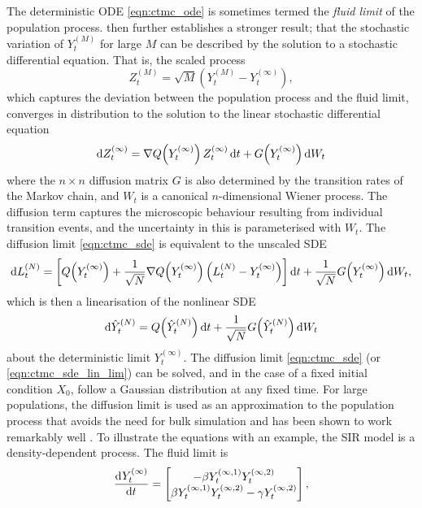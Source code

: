 The deterministic ODE \cref{eqn:ctmc_ode} is sometimes termed the \emph{fluid limit} of the population process.
\citet{Kurtz_1971_LimitTheoremsSequences} then further establishes a stronger result; that the stochastic variation of \(Y_t^{(M)}\) for large \(M\) can be described by the solution to a stochastic differential equation.
That is, the scaled process
\[
	Z_t^{(M)} = \sqrt{M}\left(Y_t^{(M)} - Y_t^{(\infty)}\right),
\]
which captures the deviation between the population process and the fluid limit, converges in distribution to the solution to the linear stochastic differential equation \citep{Kurtz_1971_LimitTheoremsSequences}
\begin{equation}
	\dif Z_t^{(\infty)} = \nabla Q\!\left(Y_t^{(\infty)}\right) Z_t^{(\infty)}\dif t + G\!\left(Y_t^{(\infty)}\right)\dif W_t
	\label{eqn:ctmc_sde}
\end{equation}
where the \(n\times n\) diffusion matrix \(G\) is also determined by the transition rates of the Markov chain, and \(W_t\) is a canonical \(n\)-dimensional Wiener process.
The diffusion term captures the microscopic behaviour resulting from individual transition events, and the uncertainty in this is parameterised with \(W_t\).
The diffusion limit \cref{eqn:ctmc_sde} is equivalent to the unscaled SDE
\begin{equation}
	\dif L_t^{(N)} = \left[Q\!\left(Y_t^{(\infty)}\right) + \frac{1}{\sqrt{N}} \nabla Q\!\left(Y_t^{(\infty)}\right)\left(L_t^{(N)} - Y_t^{(\infty)}\right)\right]\dif t + \frac{1}{\sqrt{N}}G\!\left(Y_t^{(\infty)}\right)\dif W_t,
	\label{eqn:ctmc_sde_lin_lim}
\end{equation}
which is then a linearisation of the nonlinear SDE
\begin{equation}
	\dif \hat{Y}^{(N)}_t = Q\!\left(\hat{Y}^{(N)}_t\right)\dif t + \frac{1}{\sqrt{N}}G\!\left(\hat{Y}_t^{(N)}\right)\dif W_t
	\label{eqn:ctmc_sde_lim_nonlin}
\end{equation}
about the deterministic limit \(Y_t^{(\infty)}\).
The diffusion limit \cref{eqn:ctmc_sde} (or \cref{eqn:ctmc_sde_lin_lim}) can be solved, and in the case of a fixed initial condition \(X_0\), follow a Gaussian distribution at any fixed time.
For large populations, the diffusion limit is used as an approximation to the population process that avoids the need for bulk simulation and has been shown to work remarkably well \citep{PollettEtAl_2010_ModellingPopulationProcesses}.
To illustrate the equations with an example, the SIR model is a density-dependent process.
The fluid limit is
\begin{equation}
	\dod{Y_t^{(\infty)}}{t} = \begin{bmatrix}
		-\beta Y_t^{(\infty,1)} Y_t^{(\infty, 2)} \\
		\beta Y_t^{(\infty,1)} Y_t^{(\infty, 2)} -\gamma Y_t^{(\infty, 2)}
	\end{bmatrix},
	\label{eqn:sir_fluid_limit}
\end{equation}
